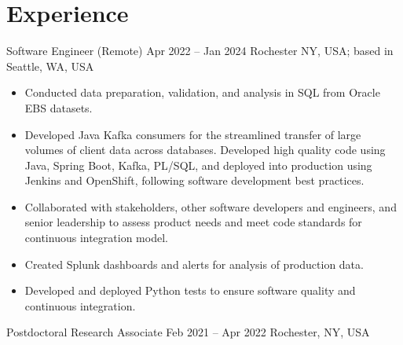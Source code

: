 \section{Experience}
\cventry{}%
{\PYX}%
{Software Engineer (Remote)}%
{Apr 2022 -- Jan 2024}%
{Rochester NY, USA; based in Seattle, WA, USA}%
{%
\begin{itemize}
    \item Conducted data preparation, validation, and analysis in SQL from Oracle EBS datasets.
    \item Developed Java Kafka consumers for the streamlined transfer of large volumes of client data across databases. Developed high quality code using Java, Spring Boot, Kafka, PL/SQL, and deployed into production using Jenkins and OpenShift, following software development best practices.
    \item Collaborated with stakeholders, other software developers and engineers, and senior leadership to assess product needs and meet code standards for continuous integration model.
    \item Created Splunk dashboards and alerts for analysis of production data.
    \item Developed and deployed Python tests to ensure software quality and continuous integration.
\end{itemize}
}
\cventry{}%
{\RIT}%
{Postdoctoral Research Associate}%
{Feb 2021 -- Apr 2022}%
{Rochester, NY, USA}%
